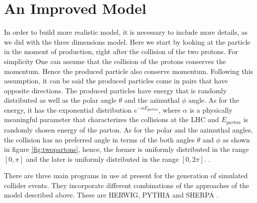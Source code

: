 \section{An Improved Model}
In order to build more realistic model, it is necessary to include more details, as we did with the three dimensions model. Here we start by looking at the particle in the moment of production, right after the collision of the two protons. For simplicity One can assume that the collision of the protons conserves the momentum. Hence the produced particle also conserve momentum.
Following this assumption, it can be said the produced particles come in pairs that have opposite directions. The produced particles have energy that is randomly distributed as well as the polar angle $\theta$ and the azimuthal $\phi$ angle. As for the energy, it has the exponential distribution $e^{- \alpha E_{parton}}$, where $\alpha$ is a physically meaningful parameter that characterizes the collisions at the LHC and $E_{parton}$ is randomly chosen energy of the parton. As for the polar and the azimuthal angles, the collision has no preferred angle in terms of the both angles $\theta$ and $\phi$ as shown in figure \ref{fig:twopartons},
hence, the former is uniformly distributed in the range $[0, \pi]$ and the later is uniformly distributed in the range $[0,2 \pi]$. \citep{Salam:2010zt}.  
%


There are three main programs in use at present for the generation of simulated collider events. They incorporate different combinations of the approaches of the model described above. These are HERWIG, PYTHIA and SHERPA \citep{Buckley:2011ms}.      